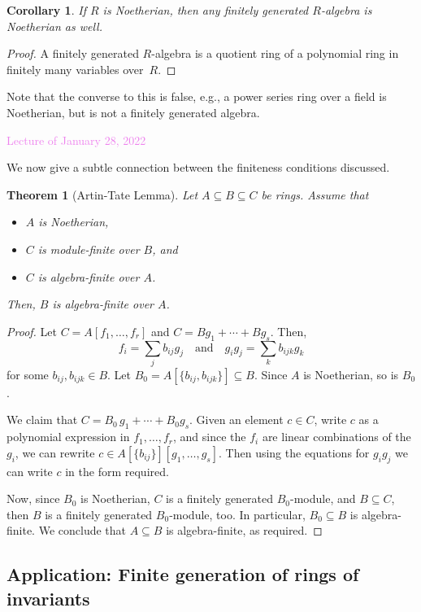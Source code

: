 \documentclass{amsart}[12pt]
\newcommand{\Jan}[1]{\textcolor{violet}{Lecture of January #1, 2022}}
\numberwithin{equation}{section}
\theoremstyle{plain} %
\newtheorem{theorem}[equation]{Theorem}
\newtheorem{cor}[equation]{Corollary}
\theoremstyle{definition}
\theoremstyle{remark}
\newcommand{\ssec}[1]{\subsection{#1}}
\begin{document}
\begin{cor} If $R$ is Noetherian, then any finitely generated $R$-algebra is Noetherian as well.
\end{cor}
\begin{proof} A finitely generated $R$-algebra is a quotient ring of a polynomial ring in finitely many variables over~$R$.
\end{proof}

Note that the converse to this is false, e.g., a power series ring over a field is Noetherian, but is not a finitely generated algebra.




\Jan{28}

We now give a subtle connection between the finiteness conditions discussed. 


\begin{theorem}[Artin-Tate Lemma]
	Let $A\subseteq B \subseteq C$ be rings. Assume that
	\begin{itemize}
		\item $A$ is Noetherian,
		\item $C$ is module-finite over $B$, and
		\item $C$ is algebra-finite over $A$.
	\end{itemize}
	Then, $B$ is algebra-finite over $A$.
\end{theorem}

\begin{proof}
	Let $C=A[f_1,\dots,f_r]$ and $C=B g_1 + \cdots + B g_s$. Then, 
	\[f_i = \sum_j b_{ij} g_j \quad \text{and} \quad g_i g_j = \sum_k b_{ijk} g_k\]
	for some $b_{ij}, b_{ijk}\in B$. Let $B_0 = A[\{b_{ij}, b_{ijk}\}] \subseteq B$. Since $A$ is Noetherian, so is $B_0$.
	
	We claim that $C=B_0 \, g_1 + \cdots + B_0 g_s$. Given an element $c\in C$, write $c$ as a polynomial expression in $f_1, \ldots, f_r$, and since the $f_i$ are linear combinations of the $g_i$, we can rewrite $c\in A[\{b_{ij}\}][g_1,\dots,g_s]$. Then using the equations for $g_i g_j$ we can write $c$ in the form required.
	
	Now, since $B_0$ is Noetherian, $C$ is a finitely generated $B_0$-module, and $B\subseteq C$, then $B$ is a finitely generated $B_0$-module, too. In particular, $B_0 \subseteq B$ is algebra-finite. We conclude that $A  \subseteq B$ is algebra-finite, as required.
\end{proof}



\ssec{Application: Finite generation of rings of invariants}
\end{document}
